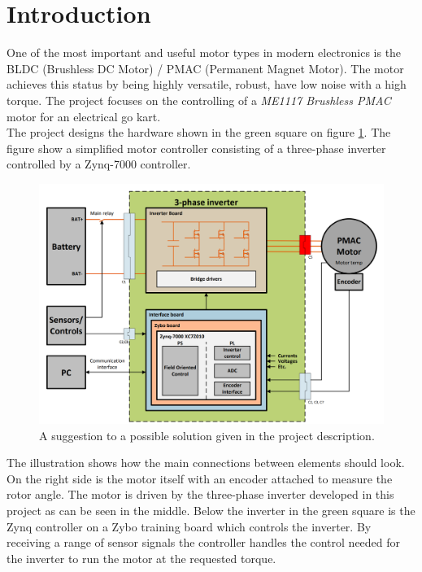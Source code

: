 \section{Introduction}
\label{sec:introduction}
One of the most important and useful motor types in modern electronics is the BLDC (Brushless DC Motor) / PMAC (Permanent Magnet Motor). The motor achieves this status by being highly versatile, robust, have low noise with a high torque. The project focuses on the controlling of a \textit{ME1117 Brushless PMAC} motor for an electrical go kart. \\

The project designs the hardware shown in the green square on figure \ref{fig:Possiblesolution}. The figure show a simplified motor controller consisting of a three-phase inverter controlled by a Zynq-7000 controller.



\begin{figure} [H]
  \centering
  \includegraphics[width=\linewidth]{pictures/general/Project1.PNG}
  \caption{A suggestion to a possible solution given in the project description. \cite{Project 1. semester - S19}}
  \label{fig:Possiblesolution}
\end{figure}

The illustration shows how the main connections between elements should look. On the right side is the motor itself with an encoder attached to measure the rotor angle. The motor is driven by the three-phase inverter developed in this project as can be seen in the middle. Below the inverter in the green square is the Zynq controller on a Zybo training board which controls the inverter. By receiving a range of sensor signals the controller handles the control needed for the inverter to run the motor at the requested torque.

